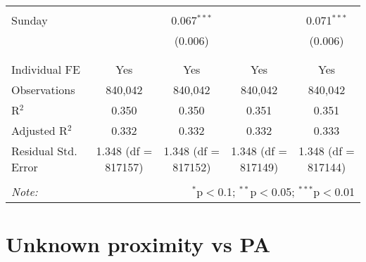 \documentclass[
]{article}
\begin{document}
\begin{table}[!htbp]
{\begin{tabular}{@{\extracolsep{5pt}}lcccc}
  & & & & \\ 
 Sunday &  & 0.067$^{***}$ &  & 0.071$^{***}$ \\ 
  &  & (0.006) &  & (0.006) \\ 
  & & & & \\ 
\hline \\[-1.8ex] 
Individual FE & Yes & Yes & Yes & Yes \\ 
Observations & 840,042 & 840,042 & 840,042 & 840,042 \\ 
R$^{2}$ & 0.350 & 0.350 & 0.351 & 0.351 \\ 
Adjusted R$^{2}$ & 0.332 & 0.332 & 0.332 & 0.333 \\ 
Residual Std. Error & 1.348 (df = 817157) & 1.348 (df = 817152) & 1.348 (df = 817149) & 1.348 (df = 817144) \\ 
\hline 
\hline \\[-1.8ex] 
\textit{Note:}  & \multicolumn{4}{r}{$^{*}$p$<$0.1; $^{**}$p$<$0.05; $^{***}$p$<$0.01} \\ 
\end{tabular}
} 
\end{table} 
\newpage
\section{Unknown proximity vs PA}
\end{document}
